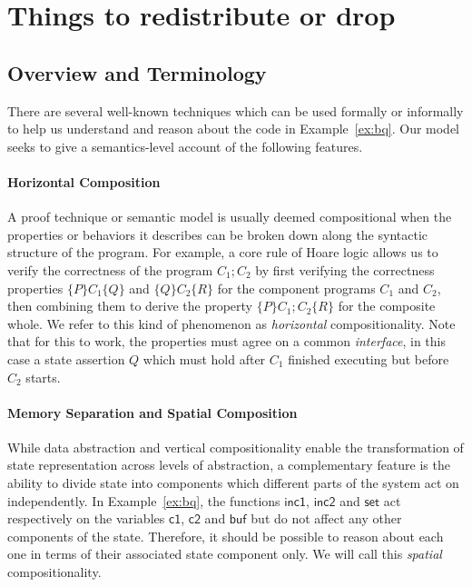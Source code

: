 \documentclass[acmsmall,screen,review,anonymous,nonacm]{acmart}
\newcommand{\kw}[1]{\ensuremath{ \mathsf{#1} }}
\begin{document}
\section{Things to redistribute or drop} %

\subsection{Overview and Terminology} \label{sec:terminology} %

There are several well-known techniques which can be used
formally or informally
to help us understand and reason about
the code in Example~\ref{ex:bq}.
Our model seeks to give a semantics-level account
of the following features.

\paragraph{Horizontal Composition} %

A proof technique or semantic model is usually deemed compositional
when the properties or behaviors it describes
can be broken down along the syntactic structure of the program.
For example,
a core rule of Hoare logic
allows us to verify the correctness of the program $C_1 \mathbin; C_2$
by first verifying the correctness properties $\{P\} C_1 \{Q\}$ and $\{Q\} C_2 \{R\}$
for the component programs $C_1$ and $C_2$,
then combining them to derive the property
$\{P\} C_1 \mathbin; C_2 \{R\}$
for the composite whole.
We refer to this kind of phenomenon as
\emph{horizontal} compositionality.
Note that for this to work,
the properties must agree on a common \emph{interface},
in this case a state assertion $Q$
which must hold after $C_1$ finished executing
but before $C_2$ starts.


\paragraph{Memory Separation and Spatial Composition} %

While data abstraction and vertical compositionality enable
the transformation of state representation
across levels of abstraction,
a complementary feature is the ability to divide
state into components
which different parts of the system
act on independently.
In Example~\ref{ex:bq},
the functions $\kw{inc1}$, $\kw{inc2}$ and $\kw{set}$
act respectively on the variables $\kw{c1}$, $\kw{c2}$ and $\kw{buf}$
but do not affect any other components of the state.
Therefore,
it should be possible to reason about each one
in terms of their associated state component only.
We will call this \emph{spatial} compositionality.
\end{document}
